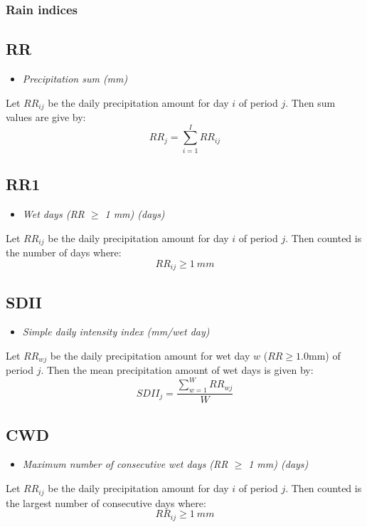 \documentclass[a4paper,11pt]{article}
\begin{document}
\subsubsection{Rain indices}

\subsection*{RR}
\begin{itemize}
\item \textit{Precipitation sum (mm)}
\end{itemize}
Let $RR_{ij}$ be the daily precipitation amount for day $i$ of period
$j$. Then sum values are give by:
\begin{equation*}
RR_{j} = \sum_{i=1}^{I} RR_{ij} 
\end{equation*}

\subsection*{RR1}
\begin{itemize}
\item \textit{Wet days (RR $\geq$ 1 mm) (days)}
\end{itemize}
Let $RR_{ij}$ be the daily precipitation amount for day $i$ of period
$j$. Then counted is the number of days where:
\begin{equation*}
RR_{ij} \geq 1~mm
\end{equation*}

\subsection*{SDII}
\begin{itemize}
\item \textit{Simple daily intensity index (mm/wet day)}
\end{itemize}
Let $RR_{wj}$ be the daily precipitation amount for wet day $w$
($RR\geq1.0$mm) of period $j$. Then the mean precipitation amount of
wet days is given by:
\begin{equation*}
SDII_j =\frac{\sum_{w=1}^{W} RR_{wj}}{W}
\end{equation*}


\subsection*{CWD}
\begin{itemize}
\item \textit{Maximum number of consecutive wet days (RR $\geq$ 1 mm) (days)}
\end{itemize}
Let $RR_{ij}$ be the daily precipitation amount for day $i$ of period
$j$. Then counted is the largest number of consecutive days where:
\begin{equation*}
RR_{ij} \geq 1~mm
\end{equation*}
\end{document}
